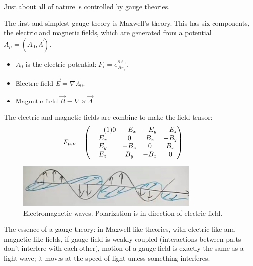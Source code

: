 \documentclass[]{article}
\newcommand\numberthis{\addtocounter{equation}{1}\tag{\theequation}}
\begin{document}
Just about all of nature is controlled by gauge theories.

The first and simplest gauge theory is Maxwell's theory. This has six components, the electric and magnetic fields, which are generated from a potential $A_\mu=(A_0,\vec{A})$.
\begin{itemize}
	\item  $A_0$ is the electric potential: $F_i=e \frac{\partial A_0}{\partial x_i}$.
	\item Electric field $\vec{E}=\nabla A_0$.
	\item Magnetic field $\vec{B}=\nabla \times \vec{A}$
\end{itemize}

The electric and magnetic fields are combine to make the field tensor\cite{susskind2017special}:
\begin{align*}
	F_{\mu,\nu} =&\begin{pmatrix} \numberthis \label{eq:field:tensor}
		0&-E_x&-E_y&-E_z\\
		E_x&0&B_z&-B_y\\
		E_y&-B_z&0&B_x\\
		E_z&B_y&-B_x&0
	\end{pmatrix}
\end{align*}

\begin{figure}[H]
	\caption[Electromagnetic waves, illustrating Polarization.]{Electromagnetic waves. Polarization is in direction of electric field.}
	\includegraphics[width=0.8\textwidth]{2-5-EM-field}
\end{figure}

The essence of a gauge theory: in Maxwell-like theories, with electric-like and magnetic-like fields, if gauge field is weakly coupled (interactions between parts don't interfere with each other), motion of a gauge field is exactly the same as a light wave; it moves at the speed of light unless something interferes.
\end{document}
